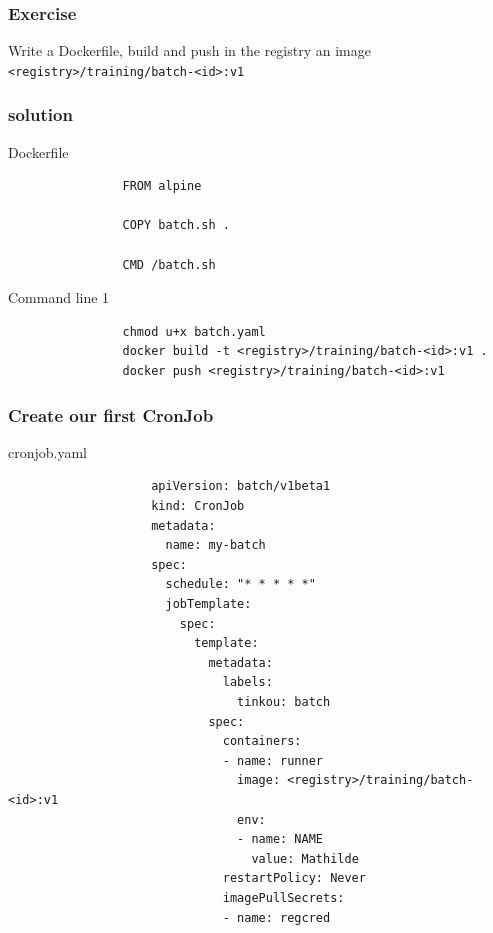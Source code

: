 	\begin{frame}[fragile]
		\frametitle{Exercise}

		Write a Dockerfile, build and push in the registry an image \verb|<registry>/training/batch-<id>:v1|
	\end{frame}

	\begin{frame}[fragile]
		\frametitle{solution}
		
		\begin{block}{Dockerfile}
			\begin{verbatim}
				FROM alpine
				
				COPY batch.sh .
				
				CMD /batch.sh
			\end{verbatim}
		\end{block}
		
		\begin{block}{Command line 1}
			\begin{verbatim}
				chmod u+x batch.yaml
				docker build -t <registry>/training/batch-<id>:v1 .
				docker push <registry>/training/batch-<id>:v1
			\end{verbatim}
		\end{block}
	\end{frame}
	
	\begin{frame}[fragile]
		\frametitle{Create our first CronJob}
		
		\begin{block}{cronjob.yaml}
			\begin{tiny}
				\begin{verbatim}
					apiVersion: batch/v1beta1
					kind: CronJob
					metadata:
					  name: my-batch
					spec:
					  schedule: "* * * * *"
					  jobTemplate:
					    spec:
					      template:
					        metadata:
					          labels:
					            tinkou: batch
					        spec:
					          containers:
					          - name: runner
					            image: <registry>/training/batch-<id>:v1
					            env:
					            - name: NAME
					              value: Mathilde
					          restartPolicy: Never
					          imagePullSecrets:
					          - name: regcred
				\end{verbatim}
			\end{tiny}
		\end{block}
	\end{frame}
	
